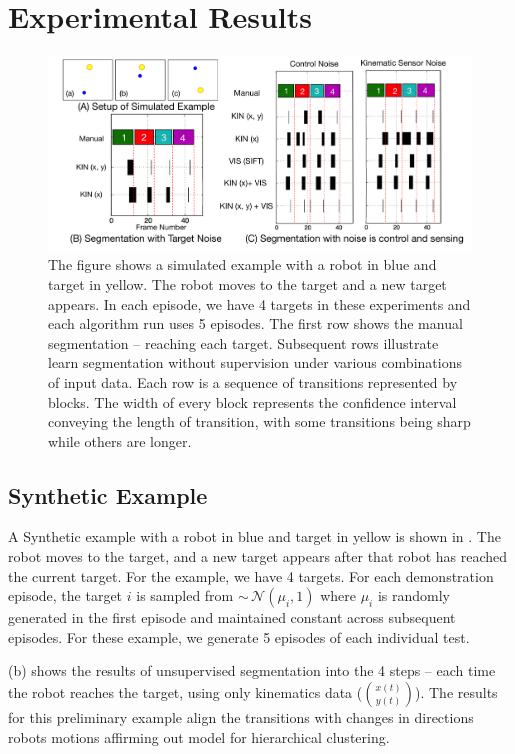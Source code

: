 \section{Experimental Results}


\begin{figure}[!t]
\centering
\includegraphics[width=0.8\linewidth]{figures/toyEx}
\caption{The figure shows a simulated example with a robot in blue and target in yellow. The robot moves to the target and a new target appears. In each episode, we have 4 targets in these experiments and each algorithm run uses 5 episodes. The first row shows the manual segmentation -- reaching each target. Subsequent rows illustrate learn segmentation without supervision under various combinations of input data.  
Each row is a sequence of transitions represented by blocks. The width of every block represents the confidence interval conveying the length of transition, with some transitions being sharp while others are longer.}
\label{fig:toyEx}
\vspace{-15pt}
\end{figure}


\subsection{Synthetic Example}
A Synthetic example with a robot in blue and target in yellow is shown in . The robot moves to the target, and a new target appears after that robot has reached the current target. For the example, we have 4 targets. For each demonstration episode, the target $i$ is sampled from  $\sim\,\mathcal{N}(\mu_i, 1)$ where $\mu_i$ is randomly generated in the first episode and maintained constant across subsequent episodes. For these example, we generate 5 episodes of each individual test.

 (b) shows the results of unsupervised segmentation into the 4 steps -- each time the robot reaches the target, using only kinematics data ($\binom{x(t)}{y(t)}$). The results for this preliminary example align the transitions with changes in directions robots motions affirming out model for hierarchical clustering. 

